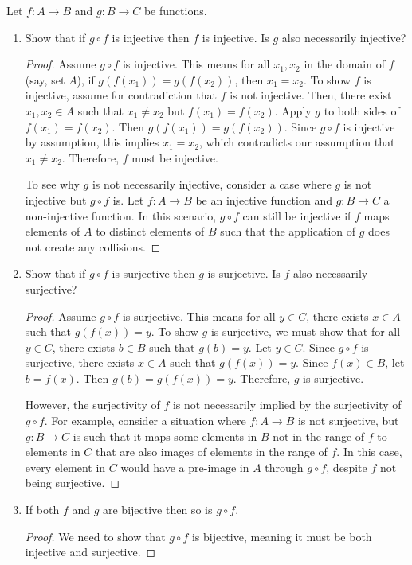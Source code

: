 \documentclass[10pt]{article}
\newenvironment{problem}[2][Problem]{\begin{trivlist}
\item[\hskip \labelsep {\bfseries #1}\hskip \labelsep {\bfseries #2.}]}{\end{trivlist}}
\begin{document}
\begin{problem}{2}
	Let $ f: A \to B $ and $ g: B \to C $ be functions.
	\begin{enumerate}
		\item Show that if $ g \circ f $ is injective then $ f $ is injective. Is $ g $ also necessarily injective?
            \begin{proof}
                Assume \( g \circ f \) is injective. This means for all \( x_1, x_2 \) in the domain of \( f \) (say, set \( A \)), if \( g(f(x_1)) = g(f(x_2)) \), then \( x_1 = x_2 \). To show \( f \) is injective, assume for contradiction that \( f \) is not injective. Then, there exist \( x_1, x_2 \in A \) such that \( x_1 \neq x_2 \) but \( f(x_1) = f(x_2) \). Apply \( g \) to both sides of \( f(x_1) = f(x_2) \). Then \( g(f(x_1)) = g(f(x_2)) \). Since \( g \circ f \) is injective by assumption, this implies \( x_1 = x_2 \), which contradicts our assumption that \( x_1 \neq x_2 \). Therefore, \( f \) must be injective.

                To see why \( g \) is not necessarily injective, consider a case where \( g \) is not injective but \( g \circ f \) is. Let \( f: A \to B \) be an injective function and \( g: B \to C \) a non-injective function. In this scenario, \( g \circ f \) can still be injective if \( f \) maps elements of \( A \) to distinct elements of \( B \) such that the application of \( g \) does not create any collisions.
            \end{proof}
		\item Show that if $ g \circ f $ is surjective then $ g $ is surjective. Is $ f $ also necessarily surjective?
            \begin{proof}
                Assume \( g \circ f \) is surjective. This means for all \( y \in C \), there exists \( x \in A \) such that \( g(f(x)) = y \). To show \( g \) is surjective, we must show that for all \( y \in C \), there exists \( b \in B \) such that \( g(b) = y \). Let \( y \in C \). Since \( g \circ f \) is surjective, there exists \( x \in A \) such that \( g(f(x)) = y \). Since \( f(x) \in B \), let \( b = f(x) \). Then \( g(b) = g(f(x)) = y \). Therefore, \( g \) is surjective.

                However, the surjectivity of \( f \) is not necessarily implied by the surjectivity of \( g \circ f \). For example, consider a situation where \( f: A \to B \) is not surjective, but \( g: B \to C \) is such that it maps some elements in \( B \) not in the range of \( f \) to elements in \( C \) that are also images of elements in the range of \( f \). In this case, every element in \( C \) would have a pre-image in \( A \) through \( g \circ f \), despite \( f \) not being surjective.
            \end{proof}
		\item If both $ f $ and $ g $ are bijective then so is $ g \circ f $.
            \begin{proof}
                We need to show that \( g \circ f \) is bijective, meaning it must be both injective and surjective.


\end{proof}
\end{enumerate}
\end{problem}
\end{document}
